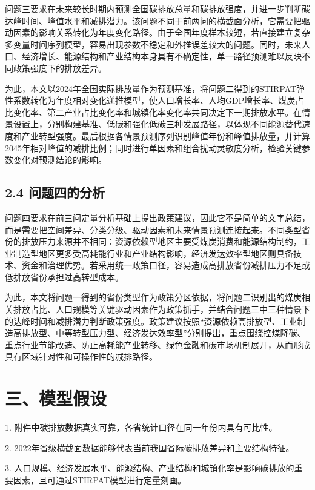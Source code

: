\documentclass[UTF8,zihao=-4,fontset=fandol]{ctexart}
\begin{document}
问题三要求在未来较长时期内预测全国碳排放总量和碳排放强度，并进一步判断碳达峰时间、峰值水平和减排潜力。该问题不同于前两问的横截面分析，它需要把驱动因素的影响关系转化为年度变化路径。由于全国年度样本较短，若直接建立复杂多变量时间序列模型，容易出现参数不稳定和外推误差较大的问题。同时，未来人口、经济增长、能源结构和产业结构本身具有不确定性，单一路径预测难以反映不同政策强度下的排放差异。

为此，本文以2024年全国实际排放量作为预测基准，将问题二得到的STIRPAT弹性系数转化为年度相对变化递推模型，使人口增长率、人均GDP增长率、煤炭占比变化率、第二产业占比变化率和城镇化率变化率共同决定下一期排放水平。在情景设置上，分别构建基准、低碳和强化低碳三种发展路径，以体现不同能源替代速度和产业转型强度。最后根据各情景预测序列识别峰值年份和峰值排放量，并计算2045年相对峰值的减排比例；同时进行单因素和组合扰动灵敏度分析，检验关键参数变化对预测结论的影响。

\subsection*{2.4 问题四的分析}

问题四要求在前三问定量分析基础上提出政策建议，因此它不是简单的文字总结，而是需要把空间差异、分类分级、驱动因素和未来情景预测连接起来。不同类型省份的排放压力来源并不相同：资源依赖型地区主要受煤炭消费和能源结构制约，工业制造型地区更多受高耗能行业和产业结构影响，经济发达效率型地区则具备技术、资金和治理优势。若采用统一政策口径，容易造成高排放省份减排压力不足或低排放省份承担过高转型成本。

为此，本文将问题一得到的省份类型作为政策分区依据，将问题二识别出的煤炭相关排放占比、人口规模等关键驱动因素作为政策抓手，并结合问题三中三种情景下的达峰时间和减排潜力判断政策强度。政策建议按照“资源依赖高排放型、工业制造高排放型、中等转型压力型、经济发达效率型”分别提出，重点围绕控煤降碳、重点行业节能改造、防止高耗能产业转移、绿色金融和碳市场机制展开，从而形成具有区域针对性和可操作性的减排路径。

\section*{三、模型假设}

1. 附件中碳排放数据真实可靠，各省统计口径在同一年份内具有可比性。

2. 2022年省级横截面数据能够代表当前我国省际碳排放差异和主要结构特征。

3. 人口规模、经济发展水平、能源结构、产业结构和城镇化率是影响碳排放的重要因素，且可通过STIRPAT模型进行定量刻画。
\end{document}
